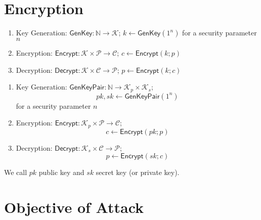 \documentclass[12pt,openany]{book}
\theoremstyle{definition}
\newcommand{\N}{\mathbb{N}}
\newcommand{\GenKey}{\mathsf{GenKey}}
\newcommand{\GenKeyPair}{\mathsf{GenKeyPair}}
\newcommand{\Encrypt}{\mathsf{Encrypt}}
\newcommand{\Decrypt}{\mathsf{Decrypt}}
\begin{document}
	\section{Encryption}
	\begin{tcolorbox}[colback=white,colframe=defcolor,arc=5pt,title={\color{white}\bf Symmetric Key Encryption}]
		\begin{enumerate}[(1)]
			\item Key Generation: $\GenKey:\N\to\mathcal{K}$; $k\gets\GenKey(1^n)$ for a security parameter $n$
			\item Encryption: $\Encrypt:\mathcal{K}\times\mathcal{P}\to\mathcal{C}$; $c\gets\Encrypt(k;p)$
			\item Decryption: $\Decrypt:\mathcal{K}\times\mathcal{C}\to\mathcal{P}$; $p\gets\Encrypt(k;c)$
		\end{enumerate}
	\end{tcolorbox}
	\vspace{8pt}
	\begin{tcolorbox}[colback=white,colframe=defcolor,arc=5pt,title={\color{white}\bf Public Key Encryption}]
		\begin{enumerate}[(1)]
			\item Key Generation: $\GenKeyPair:\N\to\mathcal{K}_p\times\mathcal{K}_s$; \[
			pk,sk\gets\GenKeyPair(1^n)
			\] for a security parameter $n$
			\item Encryption: $\Encrypt:\mathcal{K}_p\times\mathcal{P}\to\mathcal{C}$;
			$$c\gets\Encrypt(pk;p)$$
			\item Decryption: $\Decrypt:\mathcal{K}_s\times\mathcal{C}\to\mathcal{P}$;
			$$p\gets\Encrypt(sk;c)$$
		\end{enumerate} We call $pk$ public key and $sk$ secret key (or private key).
	\end{tcolorbox}
	
	\newpage
	\section{Objective of Attack}
\end{document}
